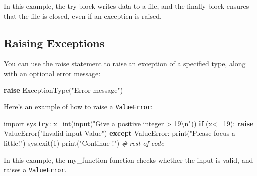\documentclass[11pt]{article}
\newenvironment{Shaded}{}{}
\newcommand{\DecValTok}[1]{\textcolor[rgb]{0.25,0.63,0.44}{{#1}}}
\newcommand{\CharTok}[1]{\textcolor[rgb]{0.25,0.44,0.63}{{#1}}}
\newcommand{\StringTok}[1]{\textcolor[rgb]{0.25,0.44,0.63}{{#1}}}
\newcommand{\CommentTok}[1]{\textcolor[rgb]{0.38,0.63,0.69}{\textit{{#1}}}}
\newcommand{\NormalTok}[1]{{#1}}
\newcommand{\ImportTok}[1]{{#1}}
\newcommand{\ControlFlowTok}[1]{\textcolor[rgb]{0.00,0.44,0.13}{\textbf{{#1}}}}
\newcommand{\OperatorTok}[1]{\textcolor[rgb]{0.40,0.40,0.40}{{#1}}}
\newcommand{\BuiltInTok}[1]{{#1}}
\newcommand{\PreprocessorTok}[1]{\textcolor[rgb]{0.74,0.48,0.00}{{#1}}}
\begin{document}
In this example, the try block writes data to a file, and the finally
block ensures that the file is closed, even if an exception is raised.

\hypertarget{raising-exceptions}{%
\subsection{Raising Exceptions}\label{raising-exceptions}}

You can use the raise statement to raise an exception of a specified
type, along with an optional error message:

\begin{Shaded}
\begin{Highlighting}[]
\ControlFlowTok{raise}\NormalTok{ ExceptionType(}\StringTok{"Error message"}\NormalTok{)}
\end{Highlighting}
\end{Shaded}

Here's an example of how to raise a \texttt{ValueError}:

\begin{Shaded}
\begin{Highlighting}[]
\ImportTok{import}\NormalTok{ sys}
\ControlFlowTok{try}\NormalTok{:}
\NormalTok{    x}\OperatorTok{=}\BuiltInTok{int}\NormalTok{(}\BuiltInTok{input}\NormalTok{(}\StringTok{"Give a positive integer \textgreater{} 19}\CharTok{\textbackslash{}n}\StringTok{"}\NormalTok{)) }
    \ControlFlowTok{if}\NormalTok{ (x}\OperatorTok{\textless{}=}\DecValTok{19}\NormalTok{):}
        \ControlFlowTok{raise} \PreprocessorTok{ValueError}\NormalTok{(}\StringTok{"Invalid input Value"}\NormalTok{)}
\ControlFlowTok{except} \PreprocessorTok{ValueError}\NormalTok{:}
    \BuiltInTok{print}\NormalTok{(}\StringTok{"Please focus a little!"}\NormalTok{)}
\NormalTok{    sys.exit(}\DecValTok{1}\NormalTok{)}
\BuiltInTok{print}\NormalTok{(}\StringTok{"Continue !"}\NormalTok{)}
\CommentTok{\# rest of code}
\end{Highlighting}
\end{Shaded}

In this example, the my\_function function checks whether the input is
valid, and raises a \texttt{ValueError}.


    
    
    
\end{document}
